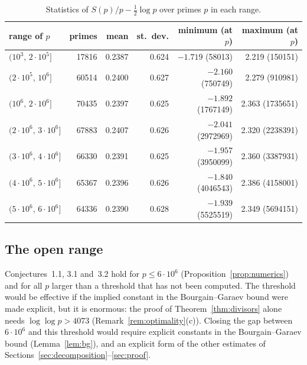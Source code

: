 \begin{table}[ht]
\small
\centering
\begin{tabular}{lrrrrr}
\toprule
range of $p$ & primes & mean & st.\ dev. & minimum (at $p$) & maximum (at $p$)\\
\midrule
$(10^3,\,2\cdot 10^5]$ & 17816 & 0.2387 & 0.624 & $-1.719$ (58013) & 2.219 (150151)\\
$(2\cdot 10^5,\,10^6]$ & 60514 & 0.2400 & 0.627 & $-2.160$ (750749) & 2.279 (910981)\\
$(10^6,\,2\cdot 10^6]$ & 70435 & 0.2397 & 0.625 & $-1.892$ (1767149) & 2.363 (1735651)\\
$(2\cdot 10^6,\,3\cdot 10^6]$ & 67883 & 0.2407 & 0.626 & $-2.041$ (2972969) & 2.320 (2238391)\\
$(3\cdot 10^6,\,4\cdot 10^6]$ & 66330 & 0.2391 & 0.625 & $-1.957$ (3950099) & 2.360 (3387931)\\
$(4\cdot 10^6,\,5\cdot 10^6]$ & 65367 & 0.2396 & 0.626 & $-1.840$ (4046543) & 2.386 (4158001)\\
$(5\cdot 10^6,\,6\cdot 10^6]$ & 64336 & 0.2390 & 0.628 & $-1.939$ (5525519) & 2.349 (5694151)\\
\bottomrule
\end{tabular}
\caption{Statistics of $S(p)/p-\frac12\log p$ over primes $p$ in each range.}\label{tab:statistics}
\end{table}

\subsection{The open range}
Conjectures~1.1, 3.1 and~3.2 hold for $p\le6\cdot10^6$ (Proposition~\ref{prop:numerics}) and for all $p$ larger than a threshold that has not been computed. The threshold would be effective if the implied constant in the Bourgain--Garaev bound were made explicit, but it is enormous: the proof of Theorem~\ref{thm:divisors} alone needs $\log\log p>4073$ (Remark~\ref{rem:optimality}(c)). Closing the gap between $6\cdot10^6$ and this threshold would require explicit constants in the Bourgain--Garaev bound (Lemma~\ref{lem:bg}), and an explicit form of the other estimates of Sections~\ref{sec:decomposition}--\ref{sec:proof}.
